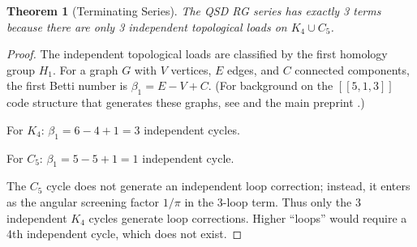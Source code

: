 \documentclass[11pt,a4paper]{article}
\newtheorem{theorem}{Theorem}[section]
\theoremstyle{definition}
\begin{document}
\begin{theorem}[Terminating Series]
\label{thm:termination}
The QSD RG series has exactly 3 terms because there are only 3 independent topological loads on $K_4 \cup C_5$.
\end{theorem}

\begin{proof}
The independent topological loads are classified by the first homology group $H_1$. For a graph $G$ with $V$ vertices, $E$ edges, and $C$ connected components, the first Betti number is $\beta_1 = E - V + C$. (For background on the $[[5,1,3]]$ code structure that generates these graphs, see \cite{Gottesman1996,Laflamme1996} and the main preprint \cite{Hubka2026QSD}.)

For $K_4$: $\beta_1 = 6 - 4 + 1 = 3$ independent cycles.

For $C_5$: $\beta_1 = 5 - 5 + 1 = 1$ independent cycle.

The $C_5$ cycle does not generate an independent loop correction; instead, it enters as the angular screening factor $1/\pi$ in the 3-loop term. Thus only the 3 independent $K_4$ cycles generate loop corrections. Higher ``loops'' would require a 4th independent cycle, which does not exist.
\end{proof}
\end{document}
